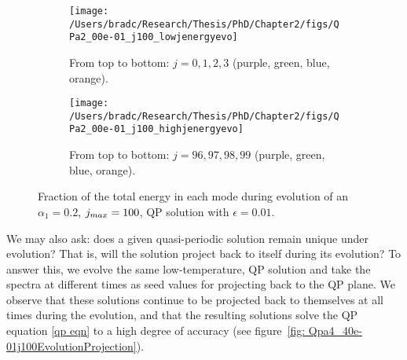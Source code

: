 \documentclass[../PhD.tex]{subfiles}
\begin{document}
\begin{figure}[H]
	\centering
	\begin{subfigure}[t]{0.47\textwidth}
		\texttt{[image: /Users/bradc/Research/Thesis/PhD/Chapter2/figs/QPa2\_00e-01\_j100\_lowjenergyevo]}
		\caption{From top to bottom: $j=0, 1, 2, 3$ (purple, green, blue, orange).}
	\end{subfigure}
	\hfill
	\begin{subfigure}[t]{0.47\textwidth}
		\texttt{[image: /Users/bradc/Research/Thesis/PhD/Chapter2/figs/QPa2\_00e-01\_j100\_highjenergyevo]}
		\caption{From top to bottom: $j=96, 97, 98, 99$ (purple, green, blue, orange).}
	\end{subfigure}
	\caption[Evolution of QP solutions at low temperature]{Fraction of the total energy in each mode during evolution of an $\alpha_1 = 0.2$, $j_{max} = 100$, QP solution with $\epsilon=0.01$.}
	\label{fig:qpevo}
\end{figure}



We may also ask: does a given quasi-periodic solution remain unique under evolution? That is, will the solution project back to itself during its evolution? To answer this, we evolve the same low-temperature, QP solution and take the spectra at different times as seed values for projecting back to the QP plane. We observe that these solutions continue to be projected back to themselves at all times during the evolution, and that the resulting solutions solve the QP equation \eqref{qp eqn} to a high degree of accuracy (see figure~\ref{fig: Qpa4_40e-01j100EvolutionProjection}). 
\end{document}
